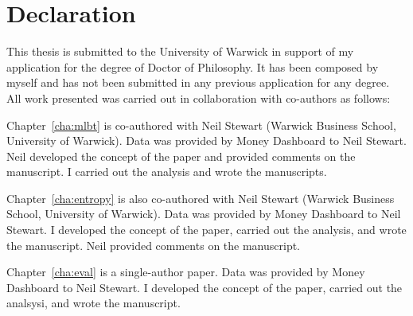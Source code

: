 
\chapter*{Declaration}%
\label{cha:declaration}

This thesis is submitted to the University of Warwick in support of my
application for the degree of Doctor of Philosophy. It has been composed by
myself and has not been submitted in any previous application for any degree.
All work presented was carried out in collaboration with co-authors as follows:

Chapter~\ref{cha:mlbt} is co-authored with Neil Stewart (Warwick Business
School, University of Warwick). Data was provided by Money Dashboard to Neil
Stewart. Neil developed the concept of the paper and provided comments on the
manuscript. I carried out the analysis and wrote the manuscripts.

Chapter~\ref{cha:entropy} is also co-authored with Neil Stewart (Warwick
Business School, University of Warwick). Data was provided by Money Dashboard
to Neil Stewart. I developed the concept of the paper, carried out the
analysis, and wrote the manuscript. Neil provided comments on the manuscript.

Chapter~\ref{cha:eval} is a single-author paper. Data was provided by Money
Dashboard to Neil Stewart. I developed the concept of the paper, carried out
the analsysi, and wrote the manuscript.

